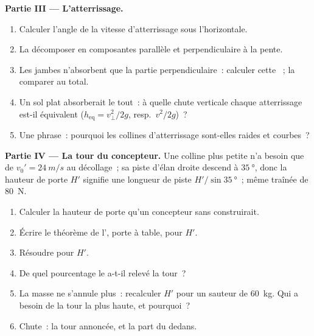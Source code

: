 \begin{problem}
\medskip\noindent\textbf{Partie III --- L'atterrissage.}
\begin{enumerate}[resume]
  \item Calculer l'angle de la vitesse d'atterrissage sous
        l'horizontale.
  \item La décomposer en composantes parallèle et perpendiculaire à
        la pente.
  \item Les jambes n'absorbent que la partie perpendiculaire~:
        calculer cette ~; la
        comparer au total.
  \item Un sol plat absorberait le tout~: à quelle chute verticale
        chaque atterrissage est-il équivalent
        ($h_{\text{eq}} = v_\perp^2/2g$, resp.\ $v^2/2g$)~?
  \item Une phrase~: pourquoi les collines d'atterrissage sont-elles
        raides et courbes~?
\end{enumerate}

\medskip\noindent\textbf{Partie IV --- La tour du concepteur.}
Une colline plus petite n'a besoin que de $v_0' = \qty{24}{m/s}$ au
décollage~; sa piste d'élan droite descend à $\qty{35}{\degree}$,
donc la hauteur de porte $H'$ signifie une longueur de piste
$H'/\sin\qty{35}{\degree}$~; même traînée de \qty{80}{N}.
\begin{enumerate}[resume]
  \item Calculer la hauteur de porte qu'un concepteur sans 
        construirait.
  \item Écrire le théorème de l', porte
        à table, pour $H'$.
  \item Résoudre pour $H'$.
  \item De quel pourcentage le  a-t-il relevé la
        tour~?
  \item La masse ne s'annule plus~: recalculer $H'$ pour un sauteur
        de \qty{60}{kg}. Qui a besoin de la tour la plus haute, et
        pourquoi~?
  \item Chute~: la tour annoncée, et la part du
         dedans.
\end{enumerate}
\end{problem}
